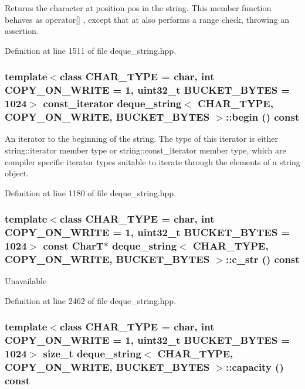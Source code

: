 Returns the character at position pos in the string. This member function behaves as operator\mbox{[}\mbox{]} , except that at also performs a range check, throwing an assertion. 

Definition at line 1511 of file deque\_\-string.hpp.\hypertarget{classdeque__string_e7839d34819def722bdfc95900ac44cf}{
\subsubsection[{begin}]{\setlength{\rightskip}{0pt plus 5cm}template$<$class CHAR\_\-TYPE  = char, int COPY\_\-ON\_\-WRITE = 1, uint32\_\-t BUCKET\_\-BYTES = 1024$>$ const\_\-iterator {\bf deque\_\-string}$<$ CHAR\_\-TYPE, COPY\_\-ON\_\-WRITE, BUCKET\_\-BYTES $>$::begin () const}}
\label{classdeque__string_e7839d34819def722bdfc95900ac44cf}


An iterator to the beginning of the string. The type of this iterator is either string::iterator member type or string::const\_\-iterator member type, which are compiler specific iterator types suitable to iterate through the elements of a string object. 

Definition at line 1180 of file deque\_\-string.hpp.\hypertarget{classdeque__string_45faac2747ddd177516bd5d41542cdd9}{
\subsubsection[{c\_\-str}]{\setlength{\rightskip}{0pt plus 5cm}template$<$class CHAR\_\-TYPE  = char, int COPY\_\-ON\_\-WRITE = 1, uint32\_\-t BUCKET\_\-BYTES = 1024$>$ const CharT$\ast$ {\bf deque\_\-string}$<$ CHAR\_\-TYPE, COPY\_\-ON\_\-WRITE, BUCKET\_\-BYTES $>$::c\_\-str () const}}
\label{classdeque__string_45faac2747ddd177516bd5d41542cdd9}


Unavailable 

Definition at line 2462 of file deque\_\-string.hpp.\hypertarget{classdeque__string_37b3b4d907d9f7a5230c23583e88880a}{
\subsubsection[{capacity}]{\setlength{\rightskip}{0pt plus 5cm}template$<$class CHAR\_\-TYPE  = char, int COPY\_\-ON\_\-WRITE = 1, uint32\_\-t BUCKET\_\-BYTES = 1024$>$ size\_\-t {\bf deque\_\-string}$<$ CHAR\_\-TYPE, COPY\_\-ON\_\-WRITE, BUCKET\_\-BYTES $>$::capacity () const}}
\label{classdeque__string_37b3b4d907d9f7a5230c23583e88880a}


